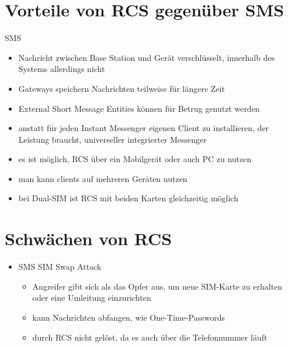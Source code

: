 \documentclass[conference]{IEEEtran}
\begin{document}
\section{Vorteile von RCS gegenüber SMS}

SMS

\begin{itemize}
    \item Nachricht zwischen Base Station und Gerät verschlüsselt, innerhalb des Systems allerdings nicht
    \item Gateways speichern Nachrichten teilweise für längere Zeit
    \item External Short Message Entities können für Betrug genutzt werden
\end{itemize}
\cite{sendoutsms}

\begin{itemize}
    \item anstatt für jeden Instant Messenger eigenen Client zu installieren, der Leistung braucht, universeller integrierter Messenger
    \item es ist möglich, RCS über ein Mobilgerät oder auch PC zu nutzen
\end{itemize}
\cite{rcsmno}

\begin{itemize}
    \item man kann clients auf mehreren Geräten nutzen
    \item bei Dual-SIM ist RCS mit beiden Karten gleichzeitig möglich
\end{itemize}
\cite{uniprof}

\section{Schwächen von RCS}

\begin{itemize}
    \item SMS SIM Swap Attack
          \begin{itemize}
              \item Angreifer gibt sich als das Opfer aus, um neue SIM-Karte zu erhalten oder eine Umleitung einzurichten
              \item kann Nachrichten abfangen, wie One-Time-Passwords
              \item durch RCS nicht gelöst, da es auch über die Telefonnummer läuft
          \end{itemize}
\end{itemize}
\cite{sendoutsms}
\end{document}
